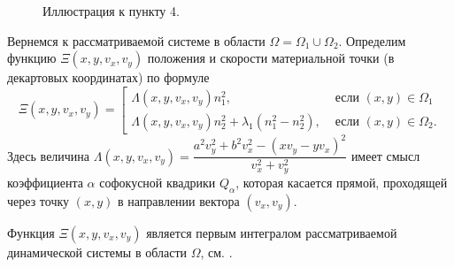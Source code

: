 \begin{figure}[!htb]
    \caption{Иллюстрация к пункту 4.}
    \label{fig:pt8:_example3}
\endminipage\hfill
\end{figure}

Вернемся к рассматриваемой системе в области $\Omega = \Omega_1 \cup \Omega_2$. Определим функцию $\Xi(x, y, v_x, v_y)$ положения и скорости материальной точки (в декартовых координатах) по формуле
\begin{equation*}
\Xi(x, y, v_x, v_y) = \left[
\begin{array}{ll}
    \Lambda(x, y, v_x, v_y) n_1^2, &  \text{ если } (x,y) \in \Omega_1 \\
    \Lambda(x, y, v_x, v_y) n_2^2 + \lambda_1 (n_1^2-n_2^2), & \text{ если } (x,y) \in \Omega_2    .
\end{array}
\right.
\end{equation*}
Здесь величина $\Lambda(x, y, v_x, v_y) =  \dfrac{a^2 v_y^2 + b^2v_x^2 - (x v_y-y v_x)^2}{v_x^2 + v_y^2}$ имеет смысл коэффициента $\alpha$  софокусной квадрики $Q_\alpha$, которая касается прямой, проходящей через точку $(x,y)$ в направлении вектора $(v_x, v_y)$.

Функция $\Xi(x, y, v_x, v_y)$ является первым интегралом рассматриваемой динамической системы в области $\Omega$, см. \cite{vestnikLatest}.

